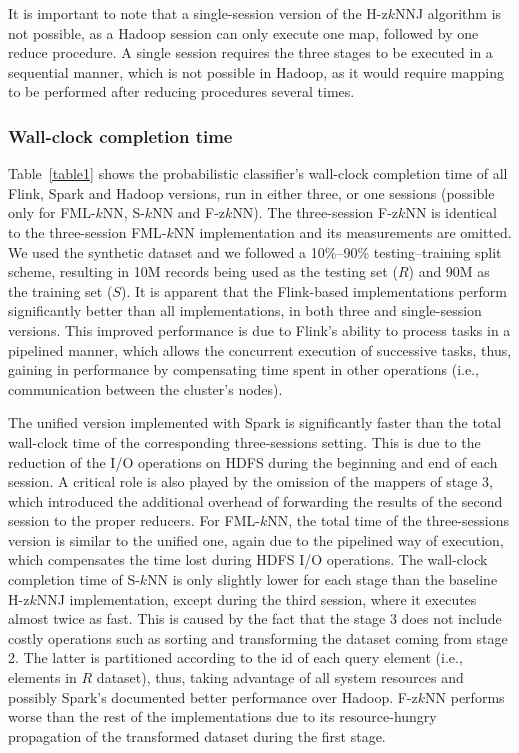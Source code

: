 It is important to note that a single-session version of the H-z$k$NNJ algorithm is not possible, as a Hadoop session can only execute one map, followed by one reduce procedure. A single session requires the three stages to be executed in a sequential manner, which is not possible in Hadoop, as it would require mapping to be performed after reducing procedures several times.

\subsubsection{Wall-clock completion time}
\label{subsubsec:comp_time}
Table~\ref{table1} shows the probabilistic classifier's wall-clock completion time of all Flink, Spark and Hadoop versions, run in either three, or one sessions (possible only for FML-$k$NN, S-$k$NN and F-z$k$NN). The three-session F-z$k$NN is identical to the three-session FML-$k$NN implementation and its measurements are omitted. We used the synthetic dataset and we followed a 10\%--90\% testing--training split scheme, resulting in 10M records being used as the testing set ($R$) and 90M as the training set ($S$). It is apparent that the Flink-based implementations perform significantly better than all implementations, in both three and single-session versions. This improved performance is due to Flink's ability to process tasks in a pipelined manner, which allows the concurrent execution of successive tasks, thus, gaining in performance by compensating time spent in other operations (i.e., communication between the cluster's nodes). 

The unified version implemented with Spark is significantly faster than the total wall-clock time of the corresponding three-sessions setting. This is due to the reduction of the I/O operations on HDFS during the beginning and end of each session. A critical role is also played by the omission of the mappers of stage 3, which introduced the additional overhead of forwarding the results of the second session to the proper reducers. For FML-$k$NN, the total time of the three-sessions version is similar to the unified one, again due to the pipelined way of execution, which compensates the time lost during HDFS I/O operations. The wall-clock completion time of S-$k$NN is only slightly lower for each stage than the baseline H-z$k$NNJ implementation, except during the third session, where it executes almost twice as fast. This is caused by the fact that the stage 3 does not include costly operations such as sorting and transforming the dataset coming from stage 2. The latter is partitioned according to the id of each query element (i.e., elements in $R$ dataset), thus, taking advantage of all system resources and possibly Spark's documented better performance over Hadoop. F-z$k$NN performs worse than the rest of the implementations due to its resource-hungry propagation of the transformed dataset during the first stage.

